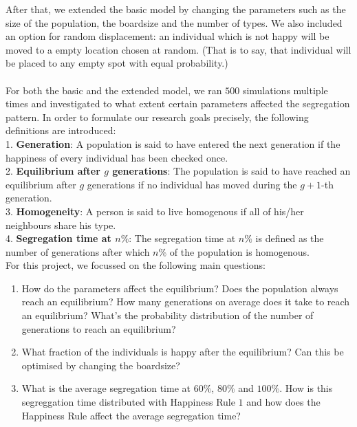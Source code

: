 After that, we extended the basic model by changing the parameters such as the size of the population, the boardsize and the number of types. 
We also included an option for random displacement: an individual which is not happy will be moved to a empty location chosen at random. 
(That is to say, that individual will be placed to any empty spot with equal probability.)\\
\\
For both the basic and the extended model, we ran $500$ simulations multiple times and investigated to what extent certain parameters affected the segregation pattern. 
In order to formulate our research goals precisely, the following definitions are introduced:\\
1. \textbf{Generation}: 
A population is said to have entered the next generation if the happiness of every individual has been checked once. \\
2. \textbf{Equilibrium after \(g\) generations}: 
The population is said to have reached an equilibrium after \(g\) generations if no individual has moved during the \(g+1\)-th generation.\\
3. \textbf{Homogeneity}:
A person is said to live homogenous if all of his/her neighbours share his type.\\
4. \textbf{Segregation time at $n\%$}: 
The segregation time at $n\%$ is defined as the number of generations after which $n\%$ of the population is homogenous.\\
\newpage
For this project, we focussed on the following main questions:\\
\begin{enumerate}
	\item How do the parameters affect the equilibrium? 
	Does the population always reach an equilibrium? 
	How many generations on average does it take to reach an equilibrium? 
	What's the probability distribution of the number of generations to reach an equilibrium?

	\item What fraction of the individuals is happy after the equilibrium? 
	Can this be optimised by changing the boardsize?
	
	\item What is the average segregation time at \(60\%\), \(80\%\) and \(100\%\). How is this segreggation time distributed with Happiness Rule \(1\) and how does the Happiness Rule affect the average segregation time?
\end{enumerate}

